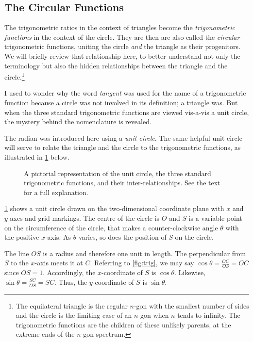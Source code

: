 \documentclass[
  a4paper,
]{article}
\begin{document}
\hypertarget{the-circular-functions}{%
\subsection{The Circular Functions}\label{the-circular-functions}}

The trigonometric ratios in the context of triangles become the
\emph{trigonometric functions} in the context of the circle. They are
then are also called the \emph{circular} trigonometric functions,
uniting the circle \emph{and} the triangle as their progenitors. We will
briefly review that relationship here, to better understand not only the
terminology but also the hidden relationships between the triangle and
the circle.\footnote{The equilateral triangle is the regular \(n\)-gon
  with the smallest number of sides and the circle is the limiting case
  of an \(n\)-gon when \(n\) tends to infinity. The trigonometric
  functions are the children of these unlikely parents, at the extreme
  ends of the \(n\)-gon spectrum.}

I used to wonder why the word \emph{tangent} was used for the name of a
trigonometric function because a circle was not involved in its
definition; a triangle was. But when the three standard trigonometric
functions are viewed vis-a-vis a unit circle, the mystery behind the
nomenclature is revealed.

The radian was introduced here using a \emph{unit circle}. The same
helpful unit circle will serve to relate the triangle and the circle to
the trigonometric functions, as illustrated in \cref{fig:unit} below.

\begin{figure}
\hypertarget{fig:unit}{%
\centering

\caption{A pictorial representation of the unit circle, the three
standard trigonometric functions, and their inter-relationships. See the
text for a full explanation.}\label{fig:unit}
}
\end{figure}

\cref{fig:unit} shows a unit circle drawn on the two-dimensional
coordinate plane with \(x\) and \(y\) axes and grid markings. The centre
of the circle is \(O\) and \(S\) is a variable point on the
circumference of the circle, that makes a counter-clockwise angle
\(\theta\) with the positive \(x\)-axis. As \(\theta\) varies, so does
the position of \(S\) on the circle.

The line \(OS\) is a radius and therefore one unit in length. The
perpendicular from \(S\) to the \(x\)-axis meets it at \(C\). Referring
to \cref{fig:trig}, we may say \(\cos\theta = \frac{OC}{OS} = OC\) since
\(OS = 1\). Accordingly, the \(x\)-coordinate of \(S\) is
\(\cos\theta\). Likewise, \(\sin\theta = \frac{SC}{OS} = SC\). Thus, the
\(y\)-coordinate of \(S\) is \(\sin\theta\).
\end{document}
